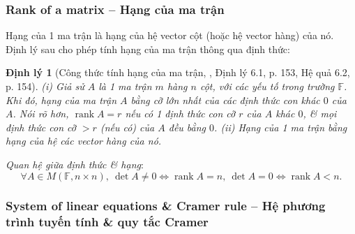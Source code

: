\documentclass{article}
\newtheorem{dinhly}{Định lý}
\begin{document}

\subsubsection{Rank of a matrix -- Hạng của ma trận}
Hạng của 1 ma trận là hạng của hệ vector cột (hoặc hệ vector hàng) của nó. Định lý sau cho phép tính hạng của ma trận thông qua định thức:

\begin{dinhly}[Công thức tính hạng của ma trận, \cite{Hung_linear_algebra}, Định lý 6.1, p. 153, Hệ quả 6.2, p. 154]
	(i) Giả sử $A$ là 1 ma trận $m$ hàng $n$ cột, với các yếu tố trong trường $\mathbb{F}$. Khi đó, hạng của ma trận $A$ bằng cỡ lớn nhất của các định thức con khác $0$ của $A$. Nói rõ hơn, $\operatorname{rank}A = r$ nếu có 1 định thức con cỡ $r$ của $A$ khác $0$, \& mọi định thức con cỡ $> r$ (nếu có) của $A$ đều bằng $0$. (ii) Hạng của 1 ma trận bằng hạng của hệ các vector hàng của nó.
\end{dinhly}
{\it Quan hệ giữa định thức \& hạng}:
\begin{equation*}
	\forall A\in M(\mathbb{F},n\times n),\ \det A\ne0\Leftrightarrow\operatorname{rank}A = n,\ \det A = 0\Leftrightarrow\operatorname{rank}A < n.
\end{equation*}


\subsubsection{System of linear equations \& Cramer rule -- Hệ phương trình tuyến tính \& quy tắc Cramer}
\end{document}
